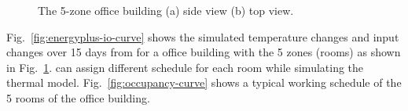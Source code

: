 

\begin{figure}[t]
    \centering
    \caption{The 5-zone office building (a) side view (b) top view.}
    \label{fig:5zone}
\end{figure}

Fig.~\ref{fig:energyplus-io-curve} shows the simulated temperature changes and
input changes over 15 days from \EP{} for a office building with the 5 zones
(rooms) as shown in Fig.~\ref{fig:5zone}.  \EP{} can assign different schedule
for each room while simulating the thermal model.
Fig.~\ref{fig:occupancy-curve} shows a typical working schedule of the 5 rooms
of the office building.

